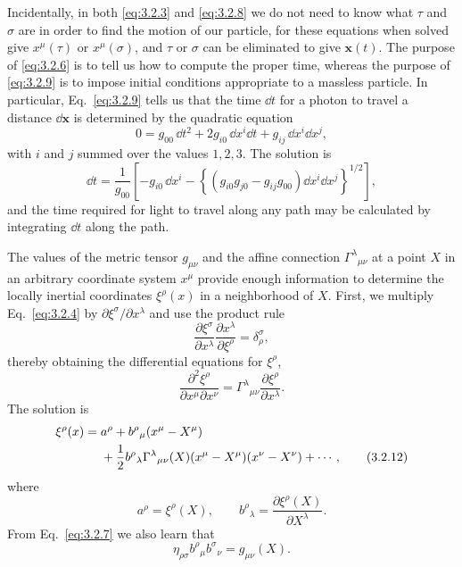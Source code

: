 Incidentally, in both \eqref{eq:3.2.3} and \eqref{eq:3.2.8} we do not need
to know what $\tau$ and $\sigma$ are in order to find the motion of our
particle, for these equations when solved give $x^\mu(\tau)$ or
$x^\mu(\sigma)$, and $\tau$ or $\sigma$ can be eliminated to give
$\mathbf x(t)$. The purpose of \eqref{eq:3.2.6} is to tell us how to compute
the proper time, whereas the purpose of \eqref{eq:3.2.9} is to impose initial
conditions appropriate to a massless particle. In particular,
Eq.~\eqref{eq:3.2.9} tells us that the time $\dd t$ for a photon to travel a
distance $\dd\mathbf x$ is determined by the quadratic equation
\[
  0=g_{00}\,\dd t^2+2g_{i0}\,\dd x^i\dd t
  +g_{ij}\,\dd x^i\dd x^j,
\]
with $i$ and $j$ summed over the values $1,2,3$. The solution is
\begin{equation}
  \dd t=\frac{1}{g_{00}}\left[
  -g_{i0}\,\dd x^i
  -\left\{(g_{i0}g_{j0}-g_{ij}g_{00})
  \dd x^i\dd x^j\right\}^{1/2}\right],
  \tag{3.2.10}\label{eq:3.2.10}
\end{equation}
and the time required for light to travel along any path may be calculated
by integrating $\dd t$ along the path.

The values of the metric tensor $g_{\mu\nu}$ and the affine connection
$\Gamma^\lambda{}_{\mu\nu}$ at a point $X$ in an arbitrary coordinate
system $x^\mu$ provide enough information to determine the locally inertial
coordinates $\xi^\rho(x)$ in a neighborhood of $X$. First, we multiply
Eq.~\eqref{eq:3.2.4} by $\partial\xi^\sigma/\partial x^\lambda$ and use the
product rule
\[
  \frac{\partial\xi^\sigma}{\partial x^\lambda}
  \frac{\partial x^\lambda}{\partial\xi^\rho}
  =\delta^\sigma_\rho,
\]
thereby obtaining the differential equations for $\xi^\rho$,
\begin{equation}
  \frac{\partial^2\xi^\rho}{\partial x^\mu\partial x^\nu}
  =\Gamma^\lambda{}_{\mu\nu}
  \frac{\partial\xi^\rho}{\partial x^\lambda}.
  \tag{3.2.11}\label{eq:3.2.11}
\end{equation}
The solution is
\begin{align}
  \xi^\rho(x)={}&a^\rho+b^\rho{}_\mu(x^\mu-X^\mu)
  \notag\\
  &+\frac12 b^\rho{}_\lambda\Gamma^\lambda{}_{\mu\nu}(X)
  (x^\mu-X^\mu)(x^\nu-X^\nu)+\cdots,
  \tag{3.2.12}\label{eq:3.2.12}
\end{align}
where
\begin{equation}
  a^\rho=\xi^\rho(X),
  \qquad
  b^\rho{}_\lambda=
  \frac{\partial\xi^\rho(X)}{\partial X^\lambda}.
  \tag{3.2.13}\label{eq:3.2.13}
\end{equation}
From Eq.~\eqref{eq:3.2.7} we also learn that
\begin{equation}
  \eta_{\rho\sigma}b^\rho{}_\mu b^\sigma{}_\nu=g_{\mu\nu}(X).
  \tag{3.2.14}\label{eq:3.2.14}
\end{equation}

